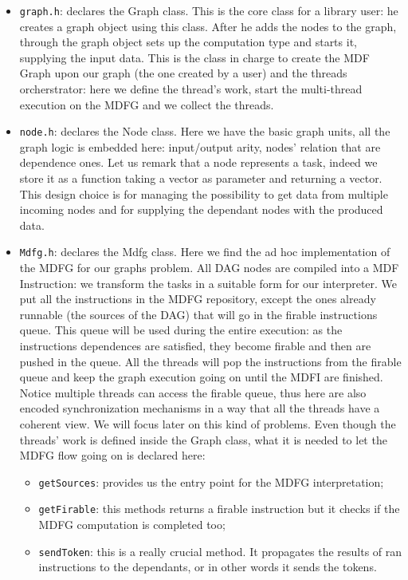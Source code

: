 \documentclass[a4paper,11pt]{article}
\begin{document}
\begin{itemize}
   \item \texttt{graph.h}: declares the Graph class. This is the core class for a library user: he creates a graph object using this class. After he adds the nodes to the graph, through the graph object sets up the computation type and starts it, supplying the input data.
   This is the class  in charge to create the MDF Graph upon our graph (the one created by a user) and the threads orcherstrator: here we define the thread's work, start the multi-thread execution on the MDFG and we collect the threads.
  \item \texttt{node.h}: declares the Node class. Here we have the basic graph units, all the graph logic is embedded here: input/output arity, nodes' relation that are dependence ones. Let us remark that a node represents a task, indeed we store it as a function taking a vector as parameter and returning a vector. This design choice is for managing the possibility to get data from multiple incoming nodes and for supplying the dependant nodes with the produced data.
  \item \texttt{Mdfg.h}: declares the Mdfg class. Here we find the ad hoc implementation of the MDFG for our graphs problem.
  All DAG nodes are compiled into a MDF Instruction: we transform the tasks in a suitable form for our interpreter. We put all the instructions in the MDFG repository, except the ones already runnable (the sources of the DAG) that will go in the firable instructions queue. This queue will be used during the entire execution: as the instructions dependences are satisfied, they become firable and then are pushed in the queue. All the threads will pop the instructions from the firable queue and keep the graph execution going on until the MDFI are finished.
  Notice multiple threads can access the firable queue, thus here are also encoded synchronization mechanisms in a way that all the threads have a coherent view.
  We will focus later on this kind of problems.  
  Even though the threads' work is defined inside the Graph class, what it is needed to let the MDFG flow going on is declared here:
  \begin{itemize}
    \item \texttt{getSources}: provides us the entry point for the MDFG interpretation;
    \item \texttt{getFirable}: this methods returns a firable instruction but it checks if the MDFG computation is completed too;
    \item \texttt{sendToken}: this is a really crucial method. It propagates the results of ran instructions to the dependants, or in other words it sends the tokens.

\end{itemize}
\end{itemize}
\end{document}
